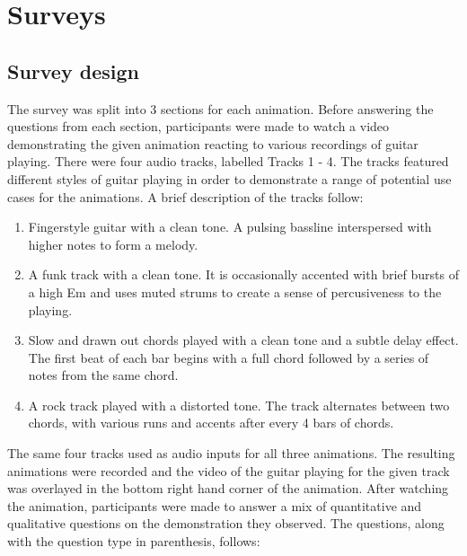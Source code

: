 \documentclass[../initial_thesis.tex]{subfiles}
\begin{document}
\section{Surveys}

\subsection{Survey design}
The survey was split into 3 sections for each animation. Before answering the questions from each section, participants were made to watch a video demonstrating the given animation reacting to various recordings of guitar playing. There were four audio tracks, labelled Tracks 1 - 4. The tracks featured different styles of guitar playing in order to demonstrate a range of potential use cases for the animations. A brief description of the tracks follow:

\begin{enumerate}
\item {Fingerstyle guitar with a clean tone. A pulsing bassline interspersed with higher notes to form a melody.}
\item {A funk track with a clean tone. It is occasionally accented with brief bursts of a high Em and uses muted strums to create a sense of percusiveness to the playing.}
\item {Slow and drawn out chords played with a clean tone and a subtle delay effect. The first beat of each bar begins with a full chord followed by a series of notes from the same chord.}
\item {A rock track played with a distorted tone. The track alternates between two chords, with various runs and accents after every 4 bars of chords.}
\end{enumerate}

The same four tracks used as audio inputs for all three animations. The resulting animations were recorded and the video of the guitar playing for the given track was overlayed in the bottom right hand corner of the animation. After watching the animation, participants were made to answer a mix of quantitative and qualitative questions on the demonstration they observed. The questions, along with the question type in parenthesis, follows:
\end{document}
